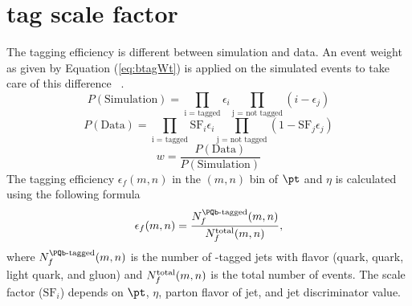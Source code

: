 \section{ tag scale factor}
\label{s:bTagSF}
The \PQb tagging efficiency is different between simulation and data.
An event weight as given by Equation (\ref{eq:btagWt}) is applied on the simulated events to 
take care of this difference ~\cite{BTagSFMethods}. 
\begin{equation}
P(\text{Simulation}) = \prod_{\text{i = tagged}} \epsilon_i \prod_{\text{j = not tagged}}(i -\epsilon_j)
\end{equation}
\begin{equation}
P(\text{Data}) = \prod_{\text{i = tagged}} \text{SF}_{i}\epsilon_i \prod_{\text{j = not tagged}} (1-\text{SF}_j\epsilon_j)
\end{equation}
\begin{equation}
w = \frac{P(\text{Data})}{P(\text{Simulation})}
\label{eq:btagWt}
\end{equation}
 The \PQb tagging efficiency $\epsilon_f(m,n)$ in the $(m,n)$ bin of $\pt$ and $\eta$ is calculated 
 using the following formula                                                               
 \begin{equation}                                                                          
  \epsilon_f(m,n)=\frac{N^{\rm {\PQb-tagged}}_f(m,n)}{N^{\rm {total}}_f(m,n)},                   
 \label{eq:btag_eff}                                                                       
 \end{equation}                                                                            
 where $N^{\rm {\PQb-tagged}}_f(m,n)$ is the number of \PQb-tagged jets with flavor 
(\PQb quark, \PQc quark, light quark, and gluon) and $N^{\rm {total}}_f(m,n)$ is the total number 
of events. The scale factor ($\text{SF}_i$) depends on $\pt$, $\eta$, parton flavor of jet, and 
\PQb jet discriminator value. 

